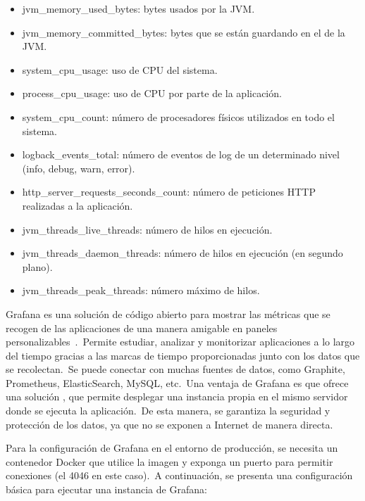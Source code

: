 \begin{itemize}
	\item jvm\_memory\_used\_bytes: bytes usados por la JVM\@.
	\item jvm\_memory\_committed\_bytes: bytes que se están guardando en el  de la JVM\@.
	\item system\_cpu\_usage: uso de CPU del sistema.
	\item process\_cpu\_usage: uso de CPU por parte de la aplicación.
	\item system\_cpu\_count: número de procesadores físicos utilizados en todo el sistema.
	\item logback\_events\_total: número de eventos de log de un determinado nivel (info, debug, warn, error).
	\item http\_server\_requests\_seconds\_count: número de peticiones HTTP realizadas a la aplicación.
	\item jvm\_threads\_live\_threads: número de hilos en ejecución.
	\item jvm\_threads\_daemon\_threads: número de hilos en ejecución (en segundo plano).
	\item jvm\_threads\_peak\_threads: número máximo de hilos.
\end{itemize}
\label{itm:most-used-metrics}

Grafana es una solución de código abierto para mostrar las métricas que se recogen de las aplicaciones de una
manera amigable en paneles personalizables~\cite{what-is-grafana}.\ Permite estudiar, analizar y monitorizar
aplicaciones a lo largo del tiempo gracias a las marcas de tiempo proporcionadas junto con los datos que se
recolectan.\ Se puede conectar con muchas fuentes de datos, como Graphite, Prometheus, ElasticSearch, MySQL, etc.\
Una ventaja de Grafana es que ofrece una solución , que permite desplegar una instancia propia en
el mismo servidor donde se ejecuta la aplicación.\ De esta manera, se garantiza la seguridad y protección de los
datos, ya que no se exponen a Internet de manera directa.

Para la configuración de Grafana en el entorno de producción, se necesita un contenedor Docker que utilice la imagen
\monoFont{grafana/grafana-oss} y exponga un puerto para permitir conexiones (el 4046 en este caso).\ A continuación,
se presenta una configuración básica para ejecutar una instancia de Grafana:

